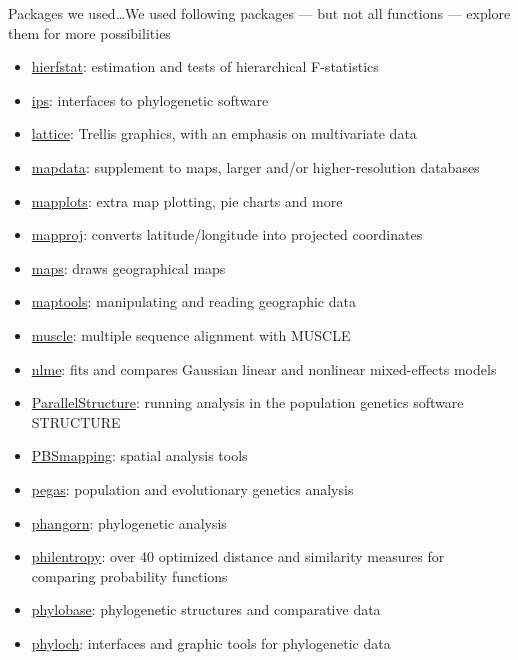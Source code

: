 \documentclass[compress, ucs, xelatex, 11pt, xcolor=svgnames,
	hyperref={
		bookmarks=true,
		unicode=true,
		colorlinks=true,
		pdftitle={Molecular data in R},
		plainpages=false,
		pdfauthor={Vojtech Zeisek},
		pdfsubject={Course about phylogeny and evolution in R},
		pdfcreator={XeLaTeX},
		pdfkeywords={R, evolution, phylogeny, molecular data},
		linkcolor=Tomato,
		anchorcolor=SaddleBrown,
		citecolor=Goldenrod,
		filecolor=DarkMagenta,
		menucolor=Sienna,
		urlcolor=DarkTurquoise,
		pdftex},
	url={hyphens, lowtilde} %
	]{beamer}
\begin{document}
\begin{frame}[allowframebreaks]{Packages we used\ldots}{We used following packages --- but not all functions --- explore them for more possibilities}
\begin{itemize}
		\item \href{https://CRAN.R-project.org/package=hierfstat}{hierfstat}: estimation and tests of hierarchical F-statistics
		\item \href{https://CRAN.R-project.org/package=ips}{ips}: interfaces to phylogenetic software
		\item \href{https://CRAN.R-project.org/package=lattice}{lattice}: Trellis graphics, with an emphasis on multivariate data
		\item \href{https://CRAN.R-project.org/package=mapdata}{mapdata}: supplement to maps, larger and/or higher-resolution databases
		\item \href{https://CRAN.R-project.org/package=mapplots}{mapplots}: extra map plotting, pie charts and more
		\item \href{https://CRAN.R-project.org/package=mapproj}{mapproj}: converts latitude/longitude into projected coordinates
		\item \href{https://CRAN.R-project.org/package=maps}{maps}: draws geographical maps
		\item \href{https://CRAN.R-project.org/package=maptools}{maptools}: manipulating and reading geographic data
		\item \href{https://bioconductor.org/packages/release/bioc/html/muscle.html}{muscle}: multiple sequence alignment with MUSCLE
		\item \href{https://CRAN.R-project.org/package=nlme}{nlme}: fits and compares Gaussian linear and nonlinear mixed-effects models
		\item \href{https://r-forge.r-project.org/projects/parallstructure/}{ParallelStructure}: running analysis in the population genetics software STRUCTURE
		\item \href{https://CRAN.R-project.org/package=PBSmapping}{PBSmapping}: spatial analysis tools
		\item \href{https://CRAN.R-project.org/package=pegas}{pegas}: population and evolutionary genetics analysis
		\item \href{https://CRAN.R-project.org/package=phangorn}{phangorn}: phylogenetic analysis
		\item \href{https://CRAN.R-project.org/package=philentropy}{philentropy}: over 40 optimized distance and similarity measures for comparing probability functions
		\item \href{https://CRAN.R-project.org/package=phylobase}{phylobase}: phylogenetic structures and comparative data
		\item \href{http://www.christophheibl.de/Rpackages.html}{phyloch}: interfaces and graphic tools for phylogenetic data

\end{itemize}
\end{frame}
\end{document}
